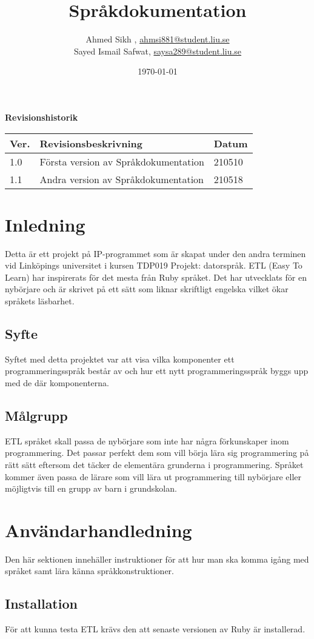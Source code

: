 \documentclass{TDP019mall}
\author{Ahmed Sikh , \url{ahmsi881@student.liu.se}\\
Sayed Ismail Safwat, \url{saysa289@student.liu.se}}
\title{Språkdokumentation}
\date{\today}
\begin{document}
\projectpage
\textbf{Revisionshistorik}
\begin{table}[!h]
\begin{tabularx}{\linewidth}{|l|X|l|}
\hline
Ver. & Revisionsbeskrivning & Datum \\\hline
1.0 & Första version av Språkdokumentation & 210510 \\\hline
1.1 & Andra version av Språkdokumentation & 210518 \\\hline
\end{tabularx}
\end{table}
\tableofcontents
\newpage



\newpage
\section{Inledning}
Detta är ett projekt på IP-programmet som är skapat under den andra terminen vid Linköpings universitet i kursen TDP019 Projekt: datorspråk.
ETL (Easy To Learn) har inspirerats för det mesta från Ruby språket. Det har utvecklats för en nybörjare och är skrivet på ett sätt som 
liknar skriftligt engelska vilket ökar språkets läsbarhet.

\subsection{Syfte}
Syftet med detta projektet var att visa vilka komponenter ett programmeringsspråk består av och hur ett nytt programmeringsspråk byggs upp med de där komponenterna. 

\subsection{Målgrupp}
ETL språket skall passa de nybörjare som inte har några förkunskaper inom programmering. Det passar perfekt dem som vill börja lära 
sig programmering på rätt sätt eftersom det täcker de elementära grunderna i programmering. Språket kommer även passa de lärare som vill lära
ut programmering till nybörjare eller möjligtvis till en grupp av barn i grundskolan.

\newpage
\section{Användarhandledning}
Den här sektionen innehäller instruktioner för att hur man ska komma igång med språket samt lära känna språkkonstruktioner. 

\subsection{Installation}
För att kunna testa ETL krävs den att senaste versionen av Ruby är installerad.
\end{document}
